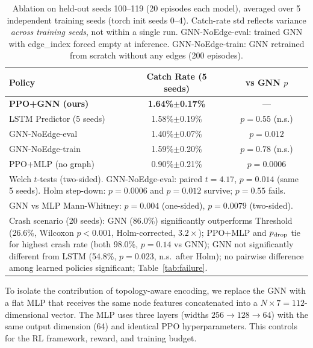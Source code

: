 \documentclass[review,1p]{elsarticle}
\theoremstyle{definition}
\begin{document}
\begin{table}[t]
\centering
\caption{Ablation on held-out seeds 100--119 (20 episodes each model),
averaged over 5 independent training seeds (torch init seeds 0--4).
Catch-rate std reflects variance \emph{across training seeds}, not within a single run.
GNN-NoEdge-eval: trained GNN with edge\_index forced empty at inference.
GNN-NoEdge-train: GNN retrained from scratch without any edges (200 episodes).}
\label{tab:ablation}
\begin{tabular}{lcc}
\toprule
Policy & Catch Rate (5 seeds) & vs GNN $p$ \\
\midrule
\textbf{PPO+GNN (ours)} & \textbf{1.64\%$\pm$0.17\%} & --- \\
LSTM Predictor (5 seeds) & 1.58\%$\pm$0.19\% & $p{=}0.55$ (n.s.) \\
GNN-NoEdge-eval & 1.40\%$\pm$0.07\% & $p{=}0.012$ \\
GNN-NoEdge-train & 1.59\%$\pm$0.20\% & $p{=}0.78$ (n.s.) \\
PPO+MLP (no graph) & 0.90\%$\pm$0.21\% & $p{=}0.0006$ \\
\midrule
\multicolumn{3}{p{0.9\columnwidth}}{\footnotesize Welch $t$-tests (two-sided). GNN-NoEdge-eval: paired $t{=}4.17$, $p{=}0.014$ (same 5 seeds). Holm step-down: $p{=}0.0006$ and $p{=}0.012$ survive; $p{=}0.55$ fails.} \\
\multicolumn{3}{p{0.9\columnwidth}}{\footnotesize GNN vs MLP Mann-Whitney: $p{=}0.004$ (one-sided), $p{=}0.0079$ (two-sided).} \\
\multicolumn{3}{p{0.9\columnwidth}}{\footnotesize Crash scenario (20 seeds): GNN (86.0\%) significantly outperforms Threshold (26.6\%, Wilcoxon $p{<}0.001$, Holm-corrected, $3.2\times$); PPO+MLP and $p_{\rm drop}$ tie for highest crash rate (both 98.0\%, $p{=}0.14$ vs GNN); GNN not significantly different from LSTM (54.8\%, $p{=}0.023$, n.s.\ after Holm); no pairwise difference among learned policies significant; Table~\ref{tab:failure}.} \\
\bottomrule
\end{tabular}
\end{table}

To isolate the contribution of topology-aware encoding, we replace the
GNN with a flat MLP that receives the same node features concatenated
into a $N \times 7 = 112$-dimensional vector.  The MLP uses three layers
(widths $256 \to 128 \to 64$) with the same output dimension (64) and identical PPO hyperparameters.
This controls for the RL framework, reward, and training budget.
\end{document}
